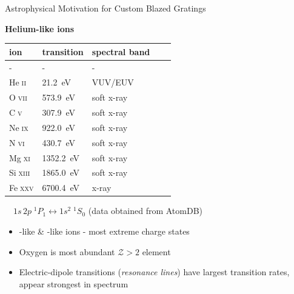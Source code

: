 \documentclass[aspectratio=169,9pt]{beamer}
\newcommand\ion[2]{#1$\;${\scshape{#2}}}%
\begin{document}
\begin{frame}{Astrophysical Motivation for Custom Blazed Gratings}
\begin{minipage}[t]{0.38\linewidth}
 \end{minipage}
\begin{minipage}[t]{0.38\linewidth} 
\textbf{\quad Helium-like ions}
\vspace{0.5mm}
\begin{table}[]
 \centering
 \begin{tabular}{@{}lllll@{}} 
 \toprule
 ion & transition & spectral band \\ \midrule
 - & - & - \\
 \ion{He}{ii} & \SI{21.2}{\electronvolt}  & VUV/EUV \\
 \ion{O}{vii} & \SI{573.9}{\electronvolt} & soft x-ray \\
 \ion{C}{v} & \SI{307.9}{\electronvolt} & soft x-ray \\
 \ion{Ne}{ix} & \SI{922.0}{\electronvolt} & soft x-ray \\
 \ion{N}{vi} & \SI{430.7}{\electronvolt} & soft x-ray \\
 \ion{Mg}{xi} & \SI{1352.2}{\electronvolt} & soft x-ray \\
 \ion{Si}{xiii} & \SI{1865.0}{\electronvolt} & soft x-ray \\
 \ion{Fe}{xxv} & \SI{6700.4}{\electronvolt} & x-ray \\
 \bottomrule
 \end{tabular}
 \end{table}
 $\quad 1s \, 2 p \; {}^1 \! P_{1} \leftrightarrow 1 s^2 \; {}^1 \! S_{0}$ {\tiny \quad (data obtained from AtomDB)}
 \end{minipage}
\vspace{1mm}
 \begin{itemize}
  \item {}-like \& -like ions - most extreme charge states
  \item Oxygen is most abundant $\mathcal{Z} > 2$ element
  \item Electric-dipole transitions (\emph{resonance lines}) have largest transition rates, appear strongest in spectrum
 \end{itemize}
\end{frame}
\end{document}
